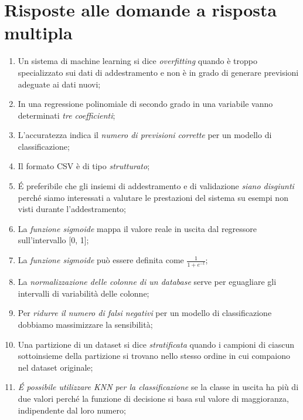 \section*{Risposte alle domande a risposta multipla}

\begin{enumerate}

	\item Un sistema di machine learning si dice \emph{overfitting} quando è troppo specializzato sui dati di addestramento e non è in grado di generare previsioni adeguate ai dati nuovi;

	\item In una regressione polinomiale di secondo grado in una variabile vanno determinati \emph{tre coefficienti};

	\item L’accuratezza indica il \emph{numero di previsioni corrette} per un modello di classificazione;

	\item Il formato CSV è di tipo \emph{strutturato};

	\item \'E preferibile che gli insiemi di addestramento e di validazione \emph{siano disgiunti} perché siamo interessati a valutare le prestazioni del sistema su esempi non visti durante l’addestramento;

	\item La \emph{funzione sigmoide} mappa il valore reale in uscita dal regressore sull’intervallo [0, 1];

	\item La \emph{funzione sigmoide} può essere definita come \( \frac{1}{1 + e^{−t}} \);

	\item La \emph{normalizzazione delle colonne di un database} serve per eguagliare gli intervalli di variabilità delle colonne;

	\item Per \emph{ridurre il numero di falsi negativi} per un modello di classificazione dobbiamo massimizzare la sensibilità;

	\item Una partizione di un dataset si dice \emph{stratificata} quando i campioni di ciascun sottoinsieme della partizione si trovano nello stesso ordine in cui compaiono nel dataset originale;

	\item \emph{\'E possibile utilizzare KNN per la classificazione} se la classe in uscita ha più di due valori perché la funzione di decisione si basa sul valore di maggioranza, indipendente dal loro numero;


\end{enumerate}
